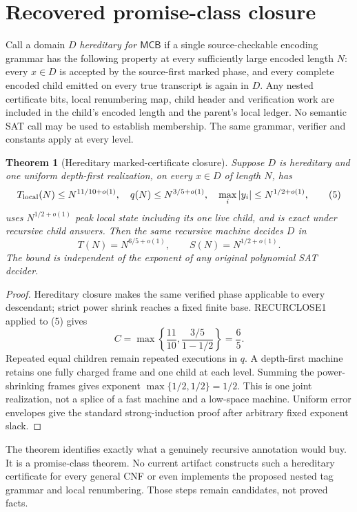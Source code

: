 \documentclass[11pt]{article}
\newtheorem{theorem}{Theorem}
\newcommand{\MCB}{\mathsf{MCB}}
\begin{document}
\section{Recovered promise-class closure}
Call a domain $D$ \emph{hereditary for $\MCB$} if a single source-checkable
encoding grammar has the following property at every sufficiently large
encoded length $N$: every $x\in D$ is accepted by the source-first marked
phase, and every complete encoded child emitted on every true transcript is
again in $D$.  Any nested certificate bits, local renumbering map, child
header and verification work are included in the child's encoded length and
the parent's local ledger.  No semantic SAT call may be used to establish
membership.  The same grammar, verifier and constants apply at every level.

\begin{theorem}[Hereditary marked-certificate closure]
Suppose $D$ is hereditary and one uniform depth-first realization, on every
$x\in D$ of length $N$, has
\[
 T_{\rm local}(N)\le N^{11/10+o(1)},\quad
 q(N)\le N^{3/5+o(1)},\quad
 \max_i |y_i|\le N^{1/2+o(1)},                              \tag{5}
\]
uses $N^{1/2+o(1)}$ peak local state including its one live child, and is
exact under recursive child answers.  Then the same recursive machine decides
$D$ in
\[
 T(N)=N^{6/5+o(1)},\qquad S(N)=N^{1/2+o(1)}.                \tag{6}
\]
The bound is independent of the exponent of any original polynomial SAT
decider.
\end{theorem}

\begin{proof}
Hereditary closure makes the same verified phase applicable to every
descendant; strict power shrink reaches a fixed finite base.  RECURCLOSE1
applied to (5) gives
\[
 C=\max\left\{\frac{11}{10},
   \frac{3/5}{1-1/2}\right\}=\frac65.                       \tag{7}
\]
Repeated equal children remain repeated executions in $q$.  A depth-first
machine retains one fully charged frame and one child at each level.  Summing
the power-shrinking frames gives exponent
$\max\{1/2,1/2\}=1/2$.  This is one joint realization, not a splice of a
fast machine and a low-space machine.  Uniform error envelopes give the
standard strong-induction proof after arbitrary fixed exponent slack.
\end{proof}

The theorem identifies exactly what a genuinely recursive annotation would
buy.  It is a promise-class theorem.  No current artifact constructs such a
hereditary certificate for every general CNF or even implements the proposed
nested tag grammar and local renumbering.  Those steps remain candidates, not
proved facts.
\end{document}
